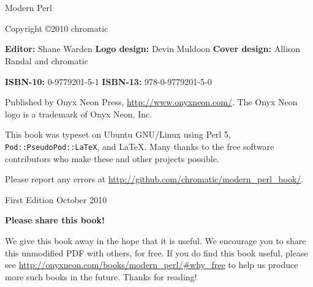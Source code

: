 \chapter*{}
\thispagestyle{empty}

\huge{Modern Perl}
\newline
\newline
\normalsize

Copyright \copyright\mbox{}2010 chromatic

\vfill
\textbf{Editor:} Shane Warden\newline
\textbf{Logo design:} Devin Muldoon\newline
\textbf{Cover design:} Allison Randal and chromatic

\textbf{ISBN-10:} 0-9779201-5-1\newline
\textbf{ISBN-13:} 978-0-9779201-5-0

Published by Onyx Neon Press, \url{http://www.onyxneon.com/}.
The Onyx Neon logo is a trademark of Onyx Neon, Inc.

This book was typeset on Ubuntu GNU/Linux using Perl 5,
\textnhtt{Pod::PseudoPod::LaTeX}, and LaTeX. Many thanks to the free software
contributors who make these and other projects possible.

Please report any errors at
\url{http://github.com/chromatic/modern_perl_book/}.

First Edition October 2010

\pagebreak
\thispagestyle{empty}

\huge
\textbf{Please share this book!}
\newline
\newline
\normalsize

We give this book away in the hope that it is useful.  We encourage you to
share this unmodified PDF with others, for free.  If you do find this book
useful, please see \url{http://onyxneon.com/books/modern_perl/#why_free} to
help us produce more such books in the future.
\newline
Thanks for reading!

